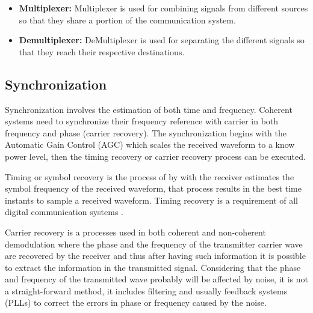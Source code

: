 \begin{itemize}


  \item \textbf{Multiplexer:} Multiplexer is used for combining signals from
different sources so that they share a portion of the communication system.

  \item \textbf{Demultiplexer:} DeMultiplexer is used for separating the different
signals so that they reach their respective destinations.


\end{itemize}

\subsection{Synchronization}

Synchronization involves the estimation of both time and frequency. Coherent
systems need to synchronize their frequency reference with carrier in both
frequency and phase (carrier recovery). The synchronization begins with the
Automatic Gain Control (AGC) which scales the received waveform to a know power
level, then the timing recovery or carrier recovery process can be executed.

Timing or symbol recovery is the process of by with the receiver estimates the
symbol frequency of the received waveform, that process results in the best time
instants to sample a received waveform. Timing recovery is a requirement of all
digital communication systems \cite{akbook}.

Carrier recovery is a processes used in both coherent and non-coherent
demodulation where the phase and the frequency of the transmitter carrier wave
are recovered by the receiver and thus after having such information it is
possible to extract the information in the transmitted signal. Considering that
the phase and frequency of the transmitted wave probably will be affected by
noise, it is not a straight-forward method, it includes filtering and usually
feedback systems (PLLs) to correct the errors in phase or frequency caused by
the noise.

